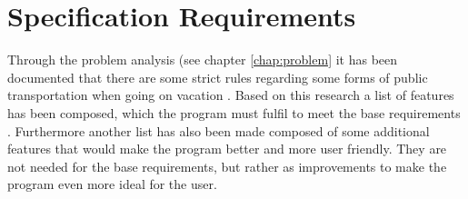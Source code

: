 \section{Specification Requirements}
\label{sec:Spec}
Through the problem analysis (see chapter \ref{chap:problem} it has been documented that there are some strict rules regarding some forms of public transportation when going on vacation . Based on this research a list of features has been composed, which the program must fulfil to meet the base requirements . Furthermore another list has also been made composed of some additional features that would make the program better and more user friendly. They are not needed for the base requirements, but rather as improvements to make the program even more ideal for the user.

